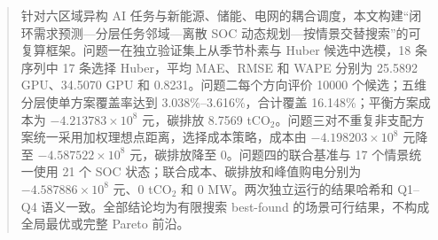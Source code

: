 \begin{abstract}
针对六区域异构 AI 任务与新能源、储能、电网的耦合调度，本文构建“闭环需求预测—分层任务邻域—离散 SOC 动态规划—按情景交替搜索”的可复算框架。问题一在独立验证集上从季节朴素与 Huber 候选中选模，18 条序列中 17 条选择 Huber，平均 MAE、RMSE 和 WAPE 分别为 25.5892 GPU、34.5070 GPU 和 0.8231。问题二每个方向评价 10000 个候选；五维分层使单方案覆盖率达到 3.038\%--3.616\%，合计覆盖 16.148\%；平衡方案成本为 $-4.213783\times10^8$ 元，碳排放 8.7569 tCO$_2$。问题三对不重复非支配方案统一采用加权理想点距离，选择成本策略，成本由 $-4.198203\times10^8$ 元降至 $-4.587522\times10^8$ 元，碳排放降至 0。问题四的联合基准与 17 个情景统一使用 21 个 SOC 状态；联合成本、碳排放和峰值购电分别为 $-4.587886\times10^8$ 元、0 tCO$_2$ 和 0 MW。两次独立运行的结果哈希和 Q1--Q4 语义一致。全部结论均为有限搜索 best-found 的场景可行结果，不构成全局最优或完整 Pareto 前沿。
\end{abstract}
